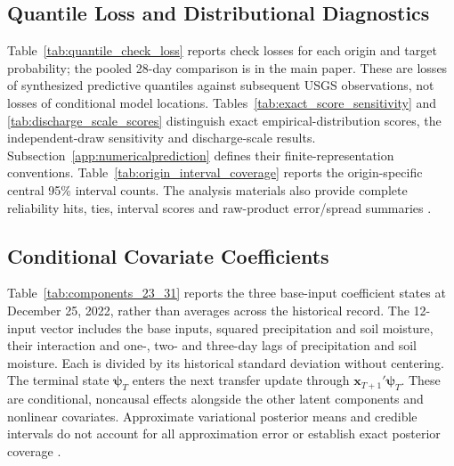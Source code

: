 \documentclass[APA,STIX1COL]{WileyNJD-v2}
\begin{document}
\subsection{Quantile Loss and Distributional Diagnostics}
\label{app:distributionchecks}

Table~\ref{tab:quantile_check_loss} reports check losses for each origin and target probability; the pooled 28-day comparison is in the main paper. These are losses of synthesized predictive quantiles against subsequent USGS observations, not losses of conditional model locations. Tables~\ref{tab:exact_score_sensitivity} and \ref{tab:discharge_scale_scores} distinguish exact empirical-distribution scores, the independent-draw sensitivity and discharge-scale results. Subsection~\ref{app:numericalprediction} defines their finite-representation conventions. Table~\ref{tab:origin_interval_coverage} reports the origin-specific central 95\% interval counts. The analysis materials also provide complete reliability hits, ties, interval scores and raw-product error/spread summaries \citep{deleon2026sanlorenzo_reproducibility}.






\subsection{Conditional Covariate Coefficients}

Table~\ref{tab:components_23_31} reports the three base-input coefficient states at December 25, 2022, rather than averages across the historical record. The 12-input vector includes the base inputs, squared precipitation and soil moisture, their interaction and one-, two- and three-day lags of precipitation and soil moisture. Each is divided by its historical standard deviation without centering. The terminal state $\boldsymbol\psi_T$ enters the next transfer update through $\mathbf x_{T+1}'\boldsymbol\psi_T$. These are conditional, noncausal effects alongside the other latent components and nonlinear covariates. Approximate variational posterior means and credible intervals do not account for all approximation error or establish exact posterior coverage \citep{blei2017variational}.


\end{document}

